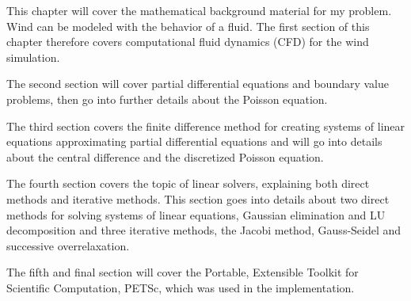 This chapter will cover the mathematical background material for my problem. Wind 
can be modeled with the behavior of a fluid. The first section of this chapter 
therefore covers computational fluid dynamics (CFD) for the wind simulation. 

The second section will cover partial differential equations and boundary value
problems, then go into further details about the Poisson equation.

The third section covers the finite difference method for creating systems of
linear equations approximating partial differential equations and will go into
details about the central difference and the discretized Poisson equation.

The fourth section covers the topic of linear solvers, explaining both direct
methods and iterative methods. This section goes into details about two direct
methods for solving systems of linear equations, Gaussian elimination and LU
decomposition and three iterative methods, the Jacobi method, Gauss-Seidel and
successive overrelaxation.

The fifth and final section will cover the Portable, Extensible Toolkit for
Scientific Computation, PETSc, which was used in the implementation.
